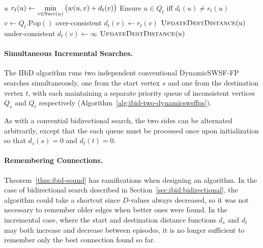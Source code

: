 {\begin{algorithm}[t]
\begin{minipage}[t]{8.2cm}
\begin{algorithmic}[1]
          {$u$}
               \State $r_t(u) \gets \displaystyle\min_{v \in \mbox{\scriptsize Succ}(u)}
                  \big( w(u,v) + d_t(v) \big)$
            \EndIf
            \State Ensure $u \in Q_t$ iff $d_t(u) \neq r_t(u)$
         \EndProcedure
          {\,\!}
            \State $v \gets Q_t.\mbox{Pop}()$
                  \Comment over-consistent
               \State $d_t(v) \gets r_t(v)$
                  \State $\mbox{\sc UpdateDestDistance}(u)$
               \EndFor
            \Else
                  \Comment under-consistent
               \State $d_t(v) \gets \infty$
                  \State $\mbox{\sc UpdateDestDistance}(u)$
               \EndFor
            \EndIf
         \EndProcedure
      \end{algorithmic}
   \end{minipage}
\end{algorithm}
} %

\paragraph{Simultaneous Incremental Searches.}
The IBiD algorithm runs two independent conventional
DynamicSWSF-FP \citep{ramalingam1996dynamicswsffp}
searches simultaneously,
one from the start vertex $s$
and one from the destination vertex $t$,
with each maintaining a separate priority queue of
inconsistent vertices $Q_s$ and $Q_t$ respectively
(Algorithm~\ref{alg:ibid-two-dynamicswsffps}).

As with a convential bidirectional search,
the two sides can be alternated arbitrarily,
except that the each queue must be processed once upon initialization
so that $d_s(s) = 0$ and $d_t(t) = 0$.

\paragraph{Remembering Connections.}
Theorem~\ref{thm:ibid-sound} has ramifications when designing
an algorithm.
In the case of bidirectional search
described in Section~\ref{sec:ibid:bidirectional},
the algorithm could take a shortcut since $D$-values always decreased,
so it was not necessary to remember older edges when better
ones were found.
In the incremental case,
where the start and destination distance functions $d_s$ and $d_t$
may both increase and decrease between episodes,
it is no longer sufficient to remember only the best connection
found so far.


